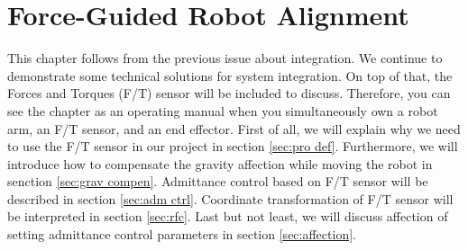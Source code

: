 \chapter{Force-Guided Robot Alignment}
\hspace*{6mm}This chapter follows from the previous issue about integration. We continue to demonstrate some technical solutions for system integration. On top of that, the Forces and Torques (F/T) sensor will be included to discuss. Therefore, you can see the chapter as an operating manual when you simultaneously own a robot arm, an F/T sensor, and an end effector. First of all, we will explain why we need to use the F/T sensor in our project in section \ref{sec:pro def}. Furthermore, we will introduce how to compensate the gravity affection while moving the robot in senction \ref{sec:grav compen}. Admittance control based on F/T sensor will be described in section \ref{sec:adm ctrl}. Coordinate transformation of F/T sensor will be interpreted in section \ref{sec:rfc}. Last but not least, we will discuss affection of setting admittance control parameters in section \ref{sec:affection}.
